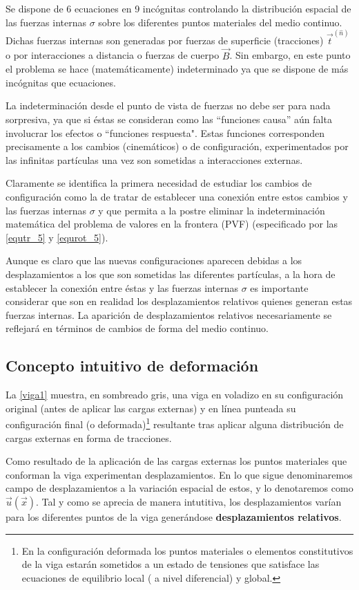 \documentclass[../notas medios.tex]{subfiles}
\begin{document}
Se dispone de 6 ecuaciones en 9 incógnitas controlando la distribución espacial de las fuerzas internas $\sigma$ sobre los diferentes puntos materiales del medio continuo.  Dichas fuerzas internas son generadas por fuerzas de superficie (tracciones) $\vec{t}^{(\hat n)}$  o por interacciones a distancia o fuerzas de cuerpo $\vec {B}$.  Sin embargo, en este punto el problema se hace (matemáticamente) indeterminado ya que se dispone de más incógnitas que ecuaciones.

La indeterminación desde el punto de vista de fuerzas no debe ser para nada sorpresiva, ya que si éstas se consideran como las ``funciones causa'' aún falta involucrar los efectos o ``funciones respuesta". Estas funciones corresponden precisamente a los cambios (cinemáticos) o de configuración, experimentados por las infinitas partículas una vez son sometidas a interacciones externas.

Claramente se identifica la primera necesidad de estudiar los cambios de configuración como la de tratar de establecer una conexión entre estos cambios y las fuerzas internas $\sigma$ y que permita a la postre eliminar la indeterminación matemática del problema de valores en la frontera (PVF) (especificado por las \cref{equtr_5} y \cref{equrot_5}).

Aunque es claro que las nuevas configuraciones aparecen debidas a los desplazamientos a los que son sometidas las diferentes partículas, a la hora de establecer la conexión entre éstas y las fuerzas internas $\sigma$ es importante considerar que son en realidad los desplazamientos relativos  quienes generan estas fuerzas internas.  La aparición de desplazamientos relativos necesariamente se reflejará en términos de cambios de forma  del medio continuo.

\subsection{Concepto intuitivo de deformación}
La \cref{viga1} muestra, en sombreado gris, una viga en voladizo en su configuración original (antes de aplicar las cargas externas) y en línea punteada su configuración final (o deformada)\footnote{En la configuración deformada los puntos materiales o elementos constitutivos de la viga estarán sometidos a un estado de tensiones que satisface las ecuaciones de equilibrio local ( a nivel diferencial) y global.} resultante tras aplicar alguna distribución de cargas externas en forma de tracciones.

Como resultado de la aplicación de las cargas externas los puntos materiales que conforman la viga experimentan desplazamientos. En lo que sigue denominaremos campo de desplazamientos a la variación espacial de estos, y lo denotaremos como $\vec u(\vec x)$. Tal y como se aprecia de manera intutitiva, los desplazamientos varían para los diferentes puntos de la viga generándose \textbf{desplazamientos relativos}.
\end{document}
